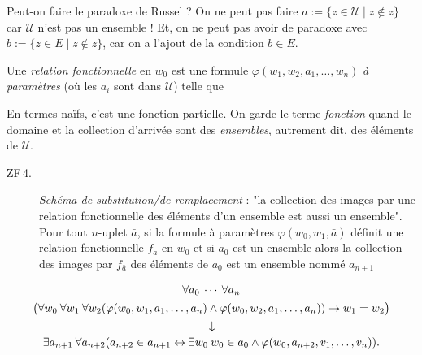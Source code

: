 \documentclass[./main]{subfiles}
\begin{document}
  \begin{rmk}
    Peut-on faire le paradoxe de Russel ?
    On ne peut pas faire $a := \{z \in \mathcal{U}  \mid z \not\in z \}$ car $\mathcal{U}$ n'est pas un ensemble !
    Et, on ne peut pas avoir de paradoxe avec $b := \{z \in E  \mid z \not\in z\}$, car on a l'ajout de la condition $b \in E$.
  \end{rmk}

  \begin{defn}
    Une \textit{relation fonctionnelle} en $w_0$ est une formule $\varphi(w_1, w_2, a_1, \ldots, w_n)$ \textit{à paramètres} (où les $a_i$ sont dans $\mathcal{U}$) telle que

  \end{defn}

  En termes naïfs, c'est une fonction partielle. On garde le terme \textit{fonction} quand le domaine et la collection d'arrivée sont des \textit{ensembles}, autrement dit, des éléments de $\mathcal{U}$.

  \begin{description}
    \item[ZF\,4.] \label{ZF4}
      \textit{Schéma de substitution/de remplacement} :
      "la collection des images par une relation fonctionnelle des éléments d'un ensemble est aussi un ensemble".
      Pour tout $n$-uplet $\bar{a}$, si la formule à paramètres $\varphi(w_0, w_1, \bar{a})$ définit une relation fonctionnelle $f_{\bar{a}}$ en $w_0$ et si $a_0$ est un ensemble alors la collection des images par $f_{\bar{a}}$ des éléments de $a_0$ est un ensemble nommé $a_{n+1}$
  \end{description}

  \begin{gather*}
    \forall a_0 \: \cdots \: \forall a_n \\
\big(
      \forall w_0 \: \forall w_1 \: \forall w_2 
        (\varphi(w_0, w_1, a_1, \ldots, a_n) \land \varphi(w_0, w_2, a_1, \ldots, a_n)) \to w_1 = w_2
      \big)\\
      \vertical\to\\
      \exists a_{n+1} \: \forall a_{n+2} (a_{n+2} \in a_{n+1} \leftrightarrow \exists w_0 \: w_0 \in a_0 \land \varphi(w_0, a_{n+2}, v_1, \ldots, v_n))
  .\end{gather*}
\end{document}
